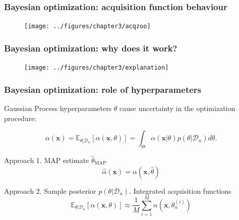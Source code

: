 \documentclass[10pt,usenames,dvipsnames]{beamer}
\begin{document}
		\begin{frame}
		\frametitle{Bayesian optimization: acquisition function behaviour}
		\begin{figure}
		\texttt{[image: ../figures/chapter3/acqzoo]}
		\end{figure}
		\end{frame}
		
		\begin{frame}
		\frametitle{Bayesian optimization: why does it work?}
		\begin{figure}
		\texttt{[image: ../figures/chapter3/explanation]}
		\end{figure}
		\end{frame}
		
		\begin{frame}
		\frametitle{Bayesian optimization: role of hyperparameters}
		
		\textcolor{NavyBlue}{Gaussian Process} hyperparameters $\theta$ cause uncertainty in the optimization procedure:		
		
		\begin{equation}
		\alpha(\boldsymbol{x}) = \mathbb{E}_{\theta|\mathcal{D}_n}\left[ \alpha(\boldsymbol{x}, \theta) \right] 		= \int_{\Theta} \alpha(\boldsymbol{x}|\theta)p(\theta|\mathcal{D}_n)d\theta.
		\end{equation}
		
		\begin{block}{Approach 1. MAP estimate $\hat{\theta}_{\mathrm{MAP}}$}
		\begin{equation}
		\hat{\alpha}(\boldsymbol{x}) = \alpha(\boldsymbol{x}, \hat{\theta})
		\end{equation}
		\end{block}
		
		\begin{block}{Approach 2. Sample posterior $p(\theta|\mathcal{D}_n)$. Integrated acquisition functions}
		\begin{equation}
	\mathbb{E}_{\theta|\mathcal{D}_n}\left[ \alpha(\boldsymbol{x},\theta )\right] \approx \dfrac{1}{M} 				\sum_{i=1}^M \alpha(\boldsymbol{x},\theta_n^{(i)})
	\end{equation}
		\end{block}
		\end{frame}
		
\end{document}
